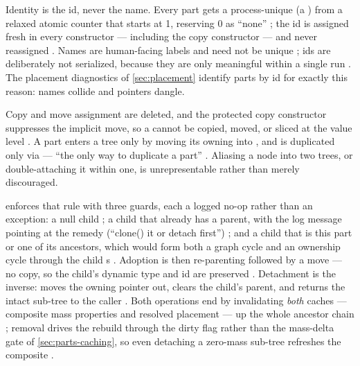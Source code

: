 
Identity is the id, never the name. Every part gets a process-unique
 (a ) from a relaxed atomic counter that starts at 1,
reserving 0 as ``none'' ; the id is assigned fresh in every
constructor --- including the copy constructor --- and never reassigned
. Names are human-facing labels and need not be unique
; ids are deliberately not serialized, because they are only
meaningful within a single run . The placement diagnostics of
\cref{sec:placement} identify parts by id for exactly this reason: names collide and pointers
dangle.

\begin{designrule}
Copy and move assignment are deleted, and the protected copy constructor suppresses the
implicit move, so a  cannot be copied, moved, or sliced at the value level
. A part enters a tree only by moving its owning
 into , and is duplicated only via  ---
``the only way to duplicate a part'' . Aliasing a node into two
trees, or double-attaching it within one, is unrepresentable rather than merely discouraged.
\end{designrule}

 enforces that rule with three guards, each a logged no-op
rather than an exception: a null child ; a child that already
has a parent, with the log message pointing at the remedy (``clone() it or detach first'')
; and a child that is this part or one of its ancestors, which
would form both a graph cycle and an ownership cycle through the child s
. Adoption is then re-parenting followed by a move --- no copy,
so the child's dynamic type and id are preserved
. Detachment is the inverse:  moves the
owning pointer out, clears the child's parent, and returns the intact sub-tree to the caller
. Both operations end by invalidating \emph{both} caches ---
composite mass properties and resolved placement --- up the whole ancestor chain
; removal drives the rebuild through the dirty flag rather than
the mass-delta gate of \cref{sec:parts-caching}, so even detaching a zero-mass sub-tree
refreshes the composite .


